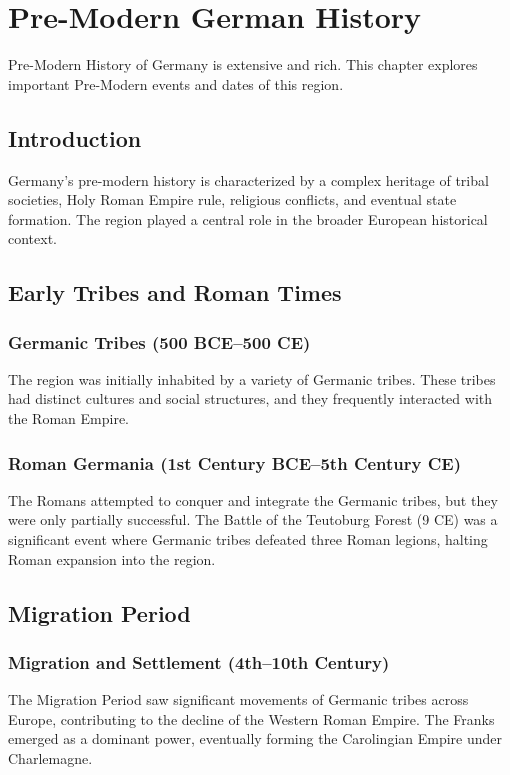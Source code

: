 \documentclass[a4paper,12pt]{book}
\begin{document}
\chapter{Pre-Modern German History}
\label{ch:pre-modern-german-history}

Pre-Modern History of Germany is extensive and rich. This chapter explores important Pre-Modern events and dates of this region.

\section{Introduction}
\label{sec:introduction-pre-modern-germany}
Germany’s pre-modern history is characterized by a complex heritage of tribal societies, Holy Roman Empire rule, religious conflicts, and eventual state formation. The region played a central role in the broader European historical context.

\section{Early Tribes and Roman Times}
\label{sec:early-tribes-roman-times}
\subsection{Germanic Tribes (500 BCE–500 CE)}
The region was initially inhabited by a variety of Germanic tribes. These tribes had distinct cultures and social structures, and they frequently interacted with the Roman Empire.

\subsection{Roman Germania (1st Century BCE–5th Century CE)}
The Romans attempted to conquer and integrate the Germanic tribes, but they were only partially successful. The Battle of the Teutoburg Forest (9 CE) was a significant event where Germanic tribes defeated three Roman legions, halting Roman expansion into the region.

\section{Migration Period}
\label{sec:migration-period}
\subsection{Migration and Settlement (4th–10th Century)}
The Migration Period saw significant movements of Germanic tribes across Europe, contributing to the decline of the Western Roman Empire. The Franks emerged as a dominant power, eventually forming the Carolingian Empire under Charlemagne.
\end{document}
